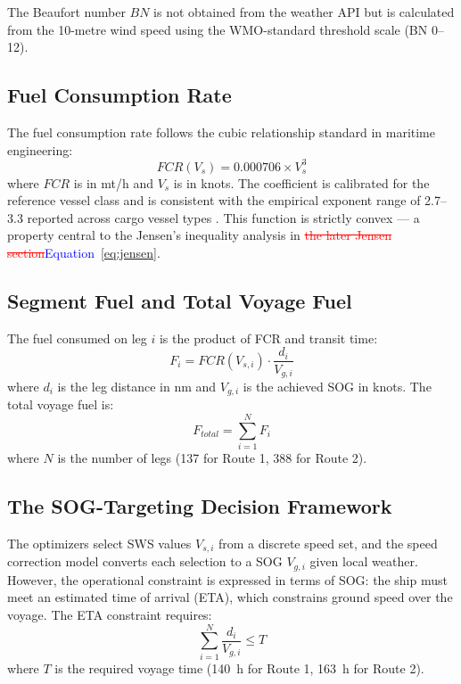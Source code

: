 \documentclass[review,authoryear]{elsarticle}  %
\newcommand{\revadd}[1]{\textcolor{blue}{#1}}
\newcommand{\revdel}[1]{\textcolor{red}{\sout{#1}}}
\begin{document}
The Beaufort number $BN$ is not obtained from the weather API but is calculated from the 10-metre wind speed using the WMO-standard threshold scale (BN 0--12).

\subsection{Fuel Consumption Rate}
\label{sec:fcr}

The fuel consumption rate follows the cubic relationship standard in maritime engineering:
\begin{equation}
    FCR(V_s) = 0.000706 \times V_s^3
    \label{eq:fcr}
\end{equation}
where $FCR$ is in mt/h and $V_s$ is in knots. The coefficient is calibrated for the reference vessel class and is consistent with the empirical exponent range of 2.7--3.3 reported across cargo vessel types \citet{Psaraftis2013,Psaraftis2023,Taskar2020}. This function is strictly convex --- a property central to the Jensen's inequality analysis in \revdel{the later Jensen section}\revadd{Equation~\ref{eq:jensen}}.

\subsection{Segment Fuel and Total Voyage Fuel}
\label{sec:fuel-total}

The fuel consumed on leg $i$ is the product of FCR and transit time:
\begin{equation}
    F_i = FCR(V_{s,i}) \cdot \frac{d_i}{V_{g,i}}
    \label{eq:leg-fuel}
\end{equation}
where $d_i$ is the leg distance in nm and $V_{g,i}$ is the achieved SOG in knots. The total voyage fuel is:
\begin{equation}
    F_{total} = \sum_{i=1}^{N} F_i
    \label{eq:total-fuel}
\end{equation}
where $N$ is the number of legs (137 for Route 1, 388 for Route 2).

\subsection{The SOG-Targeting Decision Framework}
\label{sec:sog-framework}

The optimizers select SWS values $V_{s,i}$ from a discrete speed set, and the speed correction model converts each selection to a SOG $V_{g,i}$ given local weather. However, the operational constraint is expressed in terms of SOG: the ship must meet an estimated time of arrival (ETA), which constrains ground speed over the voyage. The ETA constraint requires:
\begin{equation}
    \sum_{i=1}^{N} \frac{d_i}{V_{g,i}} \leq T
    \label{eq:eta}
\end{equation}
where $T$ is the required voyage time (140~h for Route 1, 163~h for Route 2).
\end{document}
